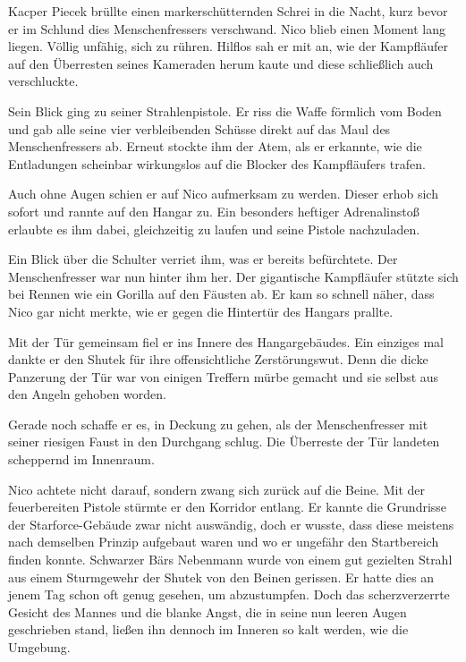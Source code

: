\par

Kacper Piecek brüllte einen markerschütternden Schrei in die Nacht, kurz bevor er im Schlund dies Menschenfressers verschwand. Nico blieb einen Moment lang liegen. Völlig unfähig, sich zu rühren. Hilflos sah er mit an, wie der Kampfläufer auf den Überresten seines Kameraden herum kaute und diese schließlich auch verschluckte.

\par

Sein Blick ging zu seiner Strahlenpistole. Er riss die Waffe förmlich vom Boden und gab alle seine vier verbleibenden Schüsse direkt auf das Maul des Menschenfressers ab. Erneut stockte ihm der Atem, als er erkannte, wie die Entladungen scheinbar wirkungslos auf die Blocker des Kampfläufers trafen.

\par

Auch ohne Augen schien er auf Nico aufmerksam zu werden. Dieser erhob sich sofort und rannte auf den Hangar zu. Ein besonders heftiger Adrenalinstoß erlaubte es ihm dabei, gleichzeitig zu laufen und seine Pistole nachzuladen.

\par

Ein Blick über die Schulter verriet ihm, was er bereits befürchtete. Der Menschenfresser war nun hinter ihm her. Der gigantische Kampfläufer stützte sich bei Rennen wie ein Gorilla auf den Fäusten ab. Er kam so schnell näher, dass Nico gar nicht merkte, wie er gegen die Hintertür des Hangars prallte.

\par

Mit der Tür gemeinsam fiel er ins Innere des Hangargebäudes. Ein einziges mal dankte er den Shutek für ihre offensichtliche Zerstörungswut. Denn die dicke Panzerung der Tür war von einigen Treffern mürbe gemacht und sie selbst aus den Angeln gehoben worden.

\par

Gerade noch schaffe er es, in Deckung zu gehen, als der Menschenfresser mit seiner riesigen Faust in den Durchgang schlug. Die Überreste der Tür landeten scheppernd im Innenraum.

\par

Nico achtete nicht darauf, sondern zwang sich zurück auf die Beine. Mit der feuerbereiten Pistole stürmte er den Korridor entlang. Er kannte die Grundrisse der Starforce-Gebäude zwar nicht auswändig, doch er wusste, dass diese meistens nach demselben Prinzip aufgebaut waren und wo er ungefähr den Startbereich finden konnte.
\ortswechsel
Schwarzer Bärs Nebenmann wurde von einem gut gezielten Strahl aus einem Sturmgewehr der Shutek von den Beinen gerissen. Er hatte dies an jenem Tag schon oft genug gesehen, um abzustumpfen. Doch das scherzverzerrte Gesicht des Mannes und die blanke Angst, die in seine nun leeren Augen geschrieben stand, ließen ihn dennoch im Inneren so kalt werden, wie die Umgebung.

